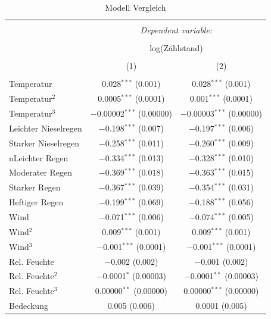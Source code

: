 \documentclass[a4paper,12pt]{thesis}
\begin{document}
	\begin{longtable}{@{\extracolsep{-5pt}}lcc} 
	\caption{Modell Vergleich} 
	\label{ZweiModelle}
	\small 
		\\[-1.8ex]\hline 
		\hline \\[-1.8ex] 
		& \multicolumn{2}{c}{\textit{Dependent variable:}} \\ 
		\cline{2-3} 
		\\[-1.8ex] & \multicolumn{2}{c}{log(Zählstand)} \\ 
		\\[-1.8ex] & (1) & (2)\\ 
		\hline \\[-1.8ex] 
		Temperatur & 0.028$^{***}$ (0.001) & 0.028$^{***}$ (0.001) \\ 
		Temperatur$^2$ & 0.0005$^{***}$ (0.0001) & 0.001$^{***}$ (0.0001) \\ 
		Temperatur$^3$ & $-$0.00002$^{***}$ (0.00000) & $-$0.00003$^{***}$ (0.00000) \\ 
		Leichter Nieselregen & $-$0.198$^{***}$ (0.007) & $-$0.197$^{***}$ (0.006) \\ 
		Starker Nieselregen & $-$0.258$^{***}$ (0.011) & $-$0.260$^{***}$ (0.009) \\ 
		nLeichter Regen & $-$0.334$^{***}$ (0.013) & $-$0.328$^{***}$ (0.010) \\ 
		Moderater Regen & $-$0.369$^{***}$ (0.018) & $-$0.363$^{***}$ (0.015) \\ 
		Starker Regen & $-$0.367$^{***}$ (0.039) & $-$0.354$^{***}$ (0.031) \\ 
		Heftiger Regen & $-$0.199$^{***}$ (0.069) & $-$0.188$^{***}$ (0.056) \\ 
		Wind & $-$0.071$^{***}$ (0.006) & $-$0.074$^{***}$ (0.005) \\ 
		Wind$^2$ & 0.009$^{***}$ (0.001) & 0.009$^{***}$ (0.001) \\ 
		Wind$^3$ & $-$0.001$^{***}$ (0.0001) & $-$0.001$^{***}$ (0.0001) \\ 
		Rel. Feuchte & $-$0.002 (0.002) & $-$0.001 (0.002) \\ 
		Rel. Feuchte$^2$ & $-$0.0001$^{*}$ (0.00003) & $-$0.0001$^{**}$ (0.00003) \\ 
		Rel. Feuchte$^3$ & 0.00000$^{**}$ (0.00000) & 0.00000$^{***}$ (0.00000) \\ 
		Bedeckung & 0.005 (0.006) & 0.0001 (0.005) \\ 

\end{longtable}
\end{document}
